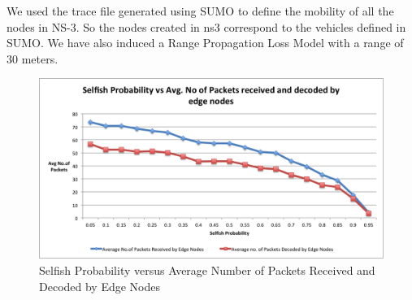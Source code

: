 \documentclass{acm_proc_article-sp}
\begin{document}
We used the trace file generated using SUMO to define the mobility of all the nodes in NS-3. So the nodes created in ns3 correspond to the vehicles defined in SUMO. We have also induced a Range Propagation Loss Model with a range of 30 meters. 



\begin{figure}
\centering
\includegraphics[scale=0.37]{selfprob.png}
\caption{Selfish Probability versus Average Number of Packets Received and Decoded by Edge Nodes}
\label{selfprob}
\end{figure}
\end{document}
